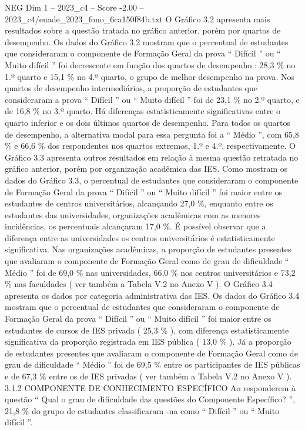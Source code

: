 \begin{textsample}{NEG Dim 1 – 2023\_c4 – Score -2.00 – 2023\_c4/enade\_2023\_fono\_6ca150f84b.txt}
O Gráfico 3.2 apresenta mais resultados sobre a questão tratada no gráfico anterior, porém por quartos de desempenho.
Os dados do Gráfico 3.2 mostram que o percentual de estudantes que consideraram o componente de Formação Geral da prova “ Difícil ” ou “ Muito difícil ” foi decrescente em função dos quartos de desempenho : 28,3 \% no 1.º quarto e 15,1 \% no 4.º quarto, o grupo de melhor desempenho na prova.
Nos quartos de desempenho intermediários, a proporção de estudantes que consideraram a prova “ Difícil ” ou “ Muito difícil ” foi de 23,1 \% no 2.º quarto, e de 16,8 \% no 3.º quarto.
Há diferenças estatisticamente significativas entre o quarto inferior e os dois últimos quartos de desempenho.
Para todos os quartos de desempenho, a alternativa modal para essa pergunta foi a “ Médio ”, com 65,8 \% e 66,6 \% dos respondentes nos quartos extremos, 1.º e 4.º, respectivamente.
O Gráfico 3.3 apresenta outros resultados em relação à mesma questão retratada no gráfico anterior, porém por organização acadêmica das IES.
Como mostram os dados do Gráfico 3.3, o percentual de estudantes que consideraram o componente de Formação Geral da prova “ Difícil ” ou “ Muito difícil ” foi maior entre os estudantes de centros universitários, alcançando 27,0 \%, enquanto entre os estudantes das universidades, organizações acadêmicas com as menores incidências, os percentuais alcançaram 17,0 \%.
É possível observar que a diferença entre as universidades os centros universitários é estatisticamente significativa.
Nas organizações acadêmicas, a proporção de estudantes presentes que avaliaram o componente de Formação Geral como de grau de dificuldade “ Médio ” foi de 69,0 \% nas universidades, 66,0 \% nos centros universitários e 73,2 \% nas faculdades ( ver também a Tabela V.2 no Anexo V ).
O Gráfico 3.4 apresenta os dados por categoria administrativa das IES.
Os dados do Gráfico 3.4 mostram que o percentual de estudantes que consideraram o componente de Formação Geral da prova “ Difícil ” ou “ Muito difícil ” foi maior entre os estudantes de cursos de IES privada ( 25,3 \% ), com diferença estatisticamente significativa da proporção registrada em IES pública ( 13,0 \% ).
Já a proporção de estudantes presentes que avaliaram o componente de Formação Geral como de grau de dificuldade “ Médio ” foi de 69,5 \% entre os participantes de IES públicas e de 67,3 \% entre os de IES privadas ( ver também a Tabela V.2 no Anexo V ). 3.1.2 COMPONENTE DE CONHECIMENTO ESPECÍFICO Ao responderem à questão “ Qual o grau de dificuldade das questões do Componente Específico? ”, 21,8 \% do grupo de estudantes classificaram -na como “ Difícil ” ou “ Muito difícil ”.

\end{textsample}
